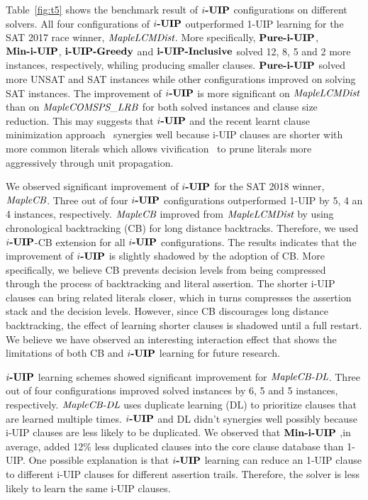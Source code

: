 \documentclass[runningheads]{llncs}
\begin{document}
Table~\ref{fig:t5} shows the benchmark result of $\textbf{$i$-UIP}$
configurations on different solvers. All four configurations of
$\textbf{$i$-UIP}$ outperformed 1-UIP learning for the SAT 2017 race winner,
$\textit{MapleLCMDist}$. More specifically, $\textbf{Pure-i-UIP}$, $\textbf{Min-i-UIP}$,
$\textbf{i-UIP-Greedy}$ and $\textbf{i-UIP-Inclusive}$ solved 12, 8, 5 and 2 more instances,
respectively, whiling producing smaller clauses. $\textbf{Pure-i-UIP}$ solved
more UNSAT and SAT instances while other configurations improved on
solving SAT instances.  The improvement of $\textbf{$i$-UIP}$ is more significant
on $\textit{MapleLCMDist}$ than on $\textit{MapleCOMSPS\_LRB}$ for both solved instances and
clause size reduction. This may suggests that $\textbf{$i$-UIP}$ and the recent
learnt clause minimization approach~\cite{} synergies well because
i-UIP clauses are shorter with more common literals which allows
vivification~\cite{} to prune literals more aggressively through unit
propagation.

We observed significant improvement of $\textbf{$i$-UIP}$ for the SAT 2018
winner, $\textit{MapleCB}$. Three out of four $\textbf{$i$-UIP}$ configurations
outperformed 1-UIP by 5, 4 an 4 instances,
respectively. $\textit{MapleCB}$ improved from $\textit{MapleLCMDist}$ by using
chronological backtracking (CB) for long distance
backtracks. Therefore, we used $\textbf{$i$-UIP}$-CB extension for all $\textbf{$i$-UIP}$
configurations. The results indicates that the improvement of $\textbf{$i$-UIP}$
is slightly shadowed by the adoption of CB. More specifically, we
believe CB prevents decision levels from being compressed through the
process of backtracking and literal assertion. The shorter i-UIP
clauses can bring related literals closer, which in turns compresses
the assertion stack and the decision levels. However, since CB
discourages long distance backtracking, the effect of learning shorter
clauses is shadowed until a full restart.  We believe we have observed
an interesting interaction effect that shows the limitations of both
CB and $\textbf{$i$-UIP}$ learning for future research.

$\textbf{$i$-UIP}$ learning schemes showed significant improvement for
$\textit{MapleCB-DL}$. Three out of four configurations improved solved
instances by 6, 5 and 5 instances, respectively. $\textit{MapleCB-DL}$
uses duplicate learning (DL) to prioritize clauses that are learned
multiple times. $\textbf{$i$-UIP}$ and DL didn't synergies well possibly because
i-UIP clauses are less likely to be duplicated. We observed that
$\textbf{Min-i-UIP}$ ,in average, added 12\% less duplicated clauses into the
core clause database than 1-UIP. One possible explanation is that
$\textbf{$i$-UIP}$ learning can reduce an 1-UIP clause to different i-UIP clauses
for different assertion trails. Therefore, the solver is less likely
to learn the same i-UIP clauses.
\end{document}
